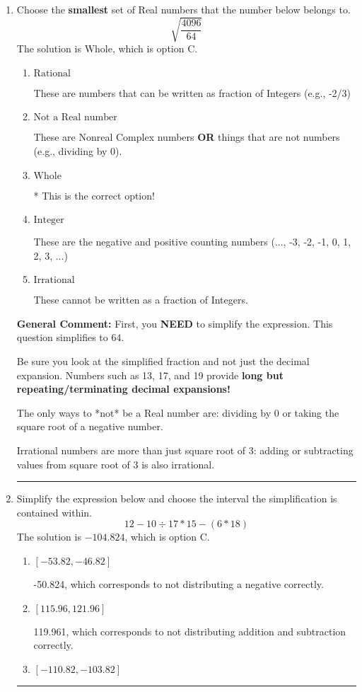 \documentclass{extbook}[14pt]
\newcommand{\litem}[1]{\item #1

\rule{\textwidth}{0.4pt}}
\begin{document}
\begin{enumerate}\litem{
Choose the \textbf{smallest} set of Real numbers that the number below belongs to.
\[ \sqrt{\frac{4096}{64}} \]The solution is \( \text{Whole} \), which is option C.\begin{enumerate}[label=\Alph*.]
\item \( \text{Rational} \)

These are numbers that can be written as fraction of Integers (e.g., -2/3)
\item \( \text{Not a Real number} \)

These are Nonreal Complex numbers \textbf{OR} things that are not numbers (e.g., dividing by 0).
\item \( \text{Whole} \)

* This is the correct option!
\item \( \text{Integer} \)

These are the negative and positive counting numbers (..., -3, -2, -1, 0, 1, 2, 3, ...)
\item \( \text{Irrational} \)

These cannot be written as a fraction of Integers.
\end{enumerate}

\textbf{General Comment:} First, you \textbf{NEED} to simplify the expression. This question simplifies to $64$. 
 
 Be sure you look at the simplified fraction and not just the decimal expansion. Numbers such as 13, 17, and 19 provide \textbf{long but repeating/terminating decimal expansions!} 
 
 The only ways to *not* be a Real number are: dividing by 0 or taking the square root of a negative number. 
 
 Irrational numbers are more than just square root of 3: adding or subtracting values from square root of 3 is also irrational.
}
\litem{
Simplify the expression below and choose the interval the simplification is contained within.
\[ 12 - 10 \div 17 * 15 - (6 * 18) \]The solution is \( -104.824 \), which is option C.\begin{enumerate}[label=\Alph*.]
\item \( [-53.82, -46.82] \)

 -50.824, which corresponds to not distributing a negative correctly.
\item \( [115.96, 121.96] \)

 119.961, which corresponds to not distributing addition and subtraction correctly.
\item \( [-110.82, -103.82] \)


\end{enumerate}}
\end{enumerate}
\end{document}
